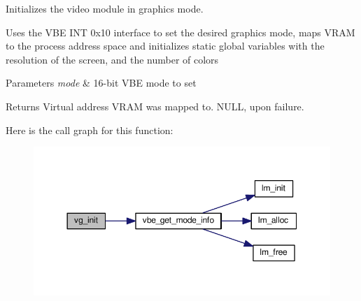 Initializes the video module in graphics mode. 

Uses the V\+BE I\+NT 0x10 interface to set the desired graphics mode, maps V\+R\+AM to the process\textquotesingle{} address space and initializes static global variables with the resolution of the screen, and the number of colors


\begin{DoxyParams}{Parameters}
{\em mode} & 16-\/bit V\+BE mode to set \\
\hline
\end{DoxyParams}
\begin{DoxyReturn}{Returns}
Virtual address V\+R\+AM was mapped to. N\+U\+LL, upon failure. 
\end{DoxyReturn}


Here is the call graph for this function\+:
\nopagebreak
\begin{figure}[H]
\begin{center}
\leavevmode
\includegraphics[width=350pt]{group__video__gr_gacef21667c79365d57a084bed994c2189_cgraph}
\end{center}
\end{figure}


